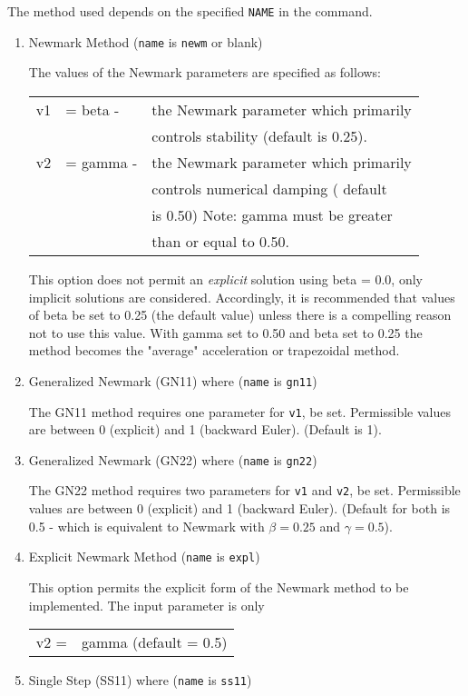 The method used depends on the specified {\tt NAME} in the command.
\begin{enumerate}
\item{
Newmark Method ({\tt name} is {\tt newm} or blank)

The values of the Newmark parameters are  specified  as
follows:
\begin{center}
\begin{tabular}{l l l}
 v1 &=  beta  - &the Newmark parameter which primarily \\
    &           &controls stability (default is 0.25). \\
 v2 &=  gamma - &the Newmark parameter which primarily \\
    &           &controls numerical damping ( default \\
    &           &is 0.50)  Note: gamma must be greater \\
    &           &than or equal to 0.50. \\
\end{tabular}
\end{center}
This option does  not  permit  an  {\it explicit}  solution
using  beta  =  0.0, only implicit solutions are considered.
Accordingly, it is recommended that values of beta be set to
0.25 (the default value) unless there is a compelling reason
not to use this value.  With gamma set to 0.50 and beta  set
to  0.25  the  method  becomes the "average" acceleration or
trapezoidal method.}
\item{
Generalized Newmark (GN11) where ({\tt name} is {\tt gn11})

The GN11 method requires  one  parameter  for
{\tt v1}, be set.  Permissible values are between 0 (explicit) and
1 (backward Euler). (Default is 1). 
}
\item{
Generalized Newmark (GN22) where ({\tt name} is {\tt gn22})

The GN22 method requires  two  parameters  for
\texttt{v1} and \texttt{v2}, be set.
Permissible values are between 0 (explicit) and
1 (backward Euler). (Default for both is 0.5 - which is equivalent
to Newmark with $\beta = 0.25$ and $\gamma = 0.5$). 
}
\item{
Explicit Newmark Method ({\tt name} is {\tt expl})

This option permits the explicit form  of  the  Newmark
method to be implemented.  The input parameter is only

\begin{center}
\begin{tabular}{l l}
 v2  =& gamma  (default = 0.5)
\end{tabular}
\end{center}
}
\item{
Single Step (SS11) where ({\tt name} is {\tt ss11})

}
\end{enumerate}
